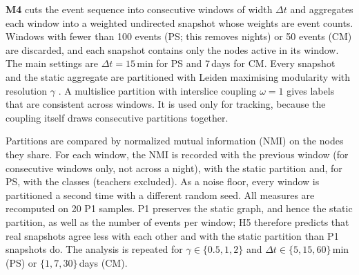 \textbf{M4} cuts the event sequence into consecutive windows of width $\Delta t$ and
aggregates each window into a weighted undirected snapshot whose weights are event
counts. Windows with fewer than 100 events (PS; this removes nights) or 50 events (CM) are
discarded, and each snapshot contains only the nodes active in its window. The main
settings are $\Delta t=15$\,min for PS and 7\,days for CM. Every snapshot and the
static aggregate are partitioned with Leiden \citep{traag2019louvain} maximising
modularity with resolution $\gamma$ \citep{reichardt2006statistical}. A multislice
partition \citep{mucha2010community} with interslice coupling $\omega=1$ gives labels
that are consistent across windows. It is used only for tracking, because the coupling
itself draws consecutive partitions together.

Partitions are compared by normalized mutual information (NMI) \citep{danon2005comparing}
on the nodes they share. For each window, the NMI is recorded with the previous window
(for consecutive windows only, not across a night), with the static partition and, for PS,
with the classes (teachers excluded). As a noise floor, every window is partitioned a
second time with a different random seed. All measures are recomputed on 20 P1 samples.
P1 preserves the static graph, and hence the static partition, as well as the number of
events per window; H5 therefore predicts that real snapshots agree less with each other
and with the static partition than P1 snapshots do. The analysis is repeated for $\gamma\in\{0.5,1,2\}$ and
$\Delta t\in\{5,15,60\}$\,min (PS) or $\{1,7,30\}$\,days (CM).
